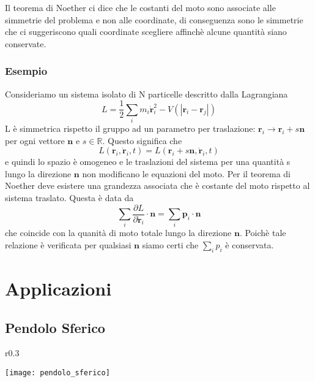 \noindent Il teorema di Noether ci dice che le costanti del moto sono associate alle simmetrie del problema e non alle coordinate, di conseguenza sono le simmetrie che ci suggeriscono quali coordinate scegliere affinch\`{e} alcune quantit\`{a} siano conservate.

\subsubsection{Esempio}
Consideriamo un sistema isolato di N particelle descritto dalla Lagrangiana
\begin{equation}
L=\frac{1}{2} \sum_i m_i \dot{\mathbf{r}}_i^2-V\left(\left|\mathbf{r}_i-\mathbf{r}_j\right|\right)
\end{equation}
L \`{e} simmetrica rispetto il gruppo ad un parametro per traslazione: $\bm{r}_i \rightarrow \bm{r}_i + s \bm{n} $ per ogni vettore $\bm{n}$ e $s \in \mathbb{R}$. Questo significa che 
\begin{equation}
L\left(\mathbf{r}_i, \dot{\mathbf{r}}_i, t\right)=L\left(\mathbf{r}_i+s \mathbf{n}, \dot{\mathbf{r}}_i, t\right)
\end{equation}
e quindi lo spazio \`{e} omogeneo e le traslazioni del sistema per una quantit\`{a} s lungo la direzione $\bm{n}$ non modificano le equazioni del moto. Per il teorema di Noether deve esistere una grandezza associata che \`{e} costante del moto rispetto al sistema traslato. Questa \`{e} data da 
\begin{equation}
\sum_i \frac{\partial L}{\partial \dot{\mathbf{r}}_i} \cdot \mathbf{n}=\sum_i \mathbf{p}_i \cdot \mathbf{n}
\end{equation}
che coincide con la quanit\`{a} di moto totale lungo la direzione $\bm{n}$. Poich\`{e} tale relazione \`{e} verificata per qualsiasi $\bm{n}$ siamo certi che $\sum_i p_i$ \`{e} conservata.

\section{Applicazioni}

\subsection{Pendolo Sferico}
\begin{wrapfigure}{r}{0.3\textwidth}
  \begin{center}
    \texttt{[image: pendolo\_sferico]}
  \end{center}
\end{wrapfigure}

